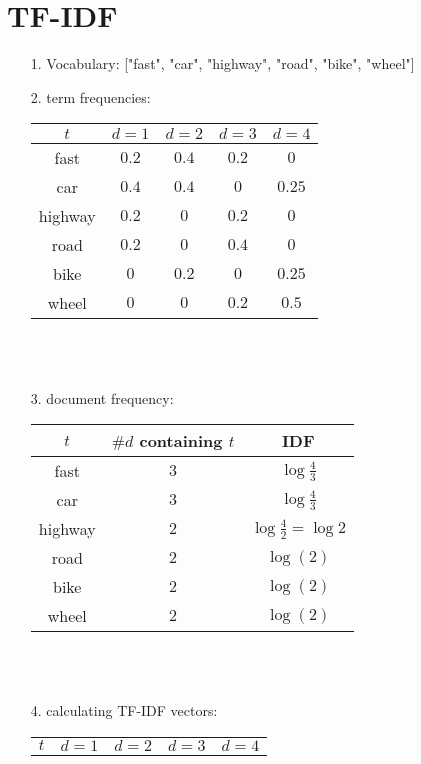     \section{TF-IDF}
    \begin{itemize}
        \item[1.] Vocabulary: ["fast", "car", "highway", "road", "bike", "wheel"]\\
        \item[2.] term frequencies:\\
        \begin{tabular}{c | c c c c}
            \(t\) & \(d = 1\) & \(d = 2\) & \(d = 3\) & \( d = 4\)\\
            \hline
            fast & \(0.2\) & \(0.4\) & \(0.2\) & \(0\) \\
            car & \( 0.4\) & \(0.4\) & \(0\) & \( 0.25\) \\
            highway & \(0.2\) & \(0\) & \(0.2\) & \(0\) \\
            road & \(0.2\) & \(0\) & \(0.4\) & \(0\) \\
            bike & \(0\) & \(0.2\) & \(0\) & \(0.25\) \\
            wheel & \(0\) & \(0\) & \(0.2\) & \(0.5\)
        \end{tabular}\\\\
        \item[3.] document frequency:\\
        \begin{tabular}{c | c | c}
            \(t\) & \(\#d\) containing \(t\) & IDF \\
            \hline
            fast & \(3\) & \(\log{\frac{4}{3}}\) \\
            car & \(3\) & \(\log{\frac{4}{3}}\) \\
            highway & \(2\) & \(\log{\frac{4}{2}} = \log{2}\) \\
            road & \(2\) & \(\log(2)\) \\
            bike & \(2\) & \(\log(2)\) \\
            wheel & \(2\) & \(\log(2)\)
        \end{tabular}\\\\
        \item[4.] calculating TF-IDF vectors:\\
        \begin{tabular}{c | c c c c}
            \(t\) & \(d = 1\) & \(d = 2\) & \(d = 3\) & \( d = 4\)\\

\end{tabular}
\end{itemize}
